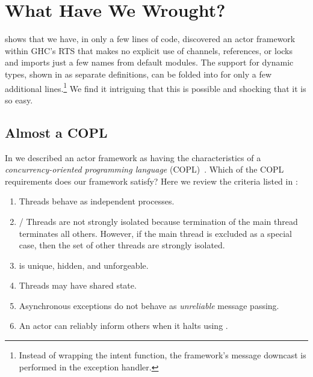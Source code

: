 \documentclass[sigplan,screen]{acmart}
\begin{document}
\section{What Have We Wrought?}
\label{sec:what-have-we-wrought}

 shows that we have, in only a few lines of
code, discovered an actor framework within GHC's RTS that makes no explicit use
of channels, references, or locks and imports just a few names from default
modules.
%
The support for dynamic types, shown in  as separate
definitions, can be folded into  for only a few
additional lines.\footnote{
    Instead of wrapping the intent function, the framework's message downcast
    is performed in the exception handler.
}
%
We find it intriguing that this is possible and shocking that it is so easy.

\subsection{Almost a COPL}
\label{sec:almost-copl}

In  we described an actor framework as having the
characteristics of a \emph{concurrency-oriented programming language}
(COPL)~\citep{armstrong2003}.
%
Which of the COPL requirements does our framework satisfy?
%
Here we review the criteria listed in :
%
%
\begin{enumerate}[leftmargin=2em]
    \item {} Threads behave as independent processes.
    \item {}/ Threads are not strongly isolated because
    termination of the main thread terminates all others. However, if the main
    thread is excluded as a special case, then the set of other threads are
    strongly isolated.
    \item {}  is unique, hidden, and unforgeable.
    \item {} Threads may have shared state.
    \item {} Asynchronous exceptions do not behave as \emph{unreliable} message passing.
    \item {} An actor can reliably inform others when it halts using
    .
\end{enumerate}
\end{document}
